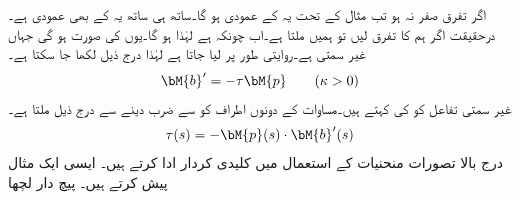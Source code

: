 اگر تفرق  صفر نہ ہو تب مثال  کے تحت یہ  کے عمودی ہو گا۔ساتھ ہی ساتھ یہ  کے بھی عمودی ہے۔درحقیقت اگر ہم  کا تفرق لیں تو ہمیں  ملتا ہے۔اب چونکہ  ہے لہٰذا  ہو گا۔یوں  کی صورت  ہو گی جہاں  غیر سمتی ہے۔روایتی طور پر  لیا جاتا ہے لہٰذا درج ذیل لکھا جا سکتا ہے۔
\begin{align}\label{مساوات_الاحصاء_مروڑ_الف}
\bM{b}'=-\tau \bM{p} \quad \quad (\kappa >0)
\end{align}
غیر سمتی تفاعل  کو  کی  کہتے ہیں۔مساوات   کے دونوں اطراف کو  سے ضرب دینے سے درج ذیل ملتا ہے۔
\begin{align}
\tau(s)=-\bM{p}(s)\cdot \bM{b}'(s)
\end{align}
درج بالا تصورات منحنیات کے استعمال میں کلیدی کردار ادا کرتے ہیں۔ ایسی ایک مثال پیش کرتے ہیں۔
\quad پیچ دار لچھا\\

